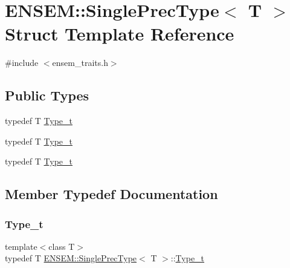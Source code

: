 \hypertarget{structENSEM_1_1SinglePrecType}{}\section{E\+N\+S\+EM\+:\+:Single\+Prec\+Type$<$ T $>$ Struct Template Reference}
\label{structENSEM_1_1SinglePrecType}


{\ttfamily \#include $<$ensem\+\_\+traits.\+h$>$}

\subsection*{Public Types}
\begin{DoxyCompactItemize}
\item 
typedef T \mbox{\hyperlink{structENSEM_1_1SinglePrecType_ab7ef789d62d59167eff4df3cc221c4e1}{Type\+\_\+t}}
\item 
typedef T \mbox{\hyperlink{structENSEM_1_1SinglePrecType_ab7ef789d62d59167eff4df3cc221c4e1}{Type\+\_\+t}}
\item 
typedef T \mbox{\hyperlink{structENSEM_1_1SinglePrecType_ab7ef789d62d59167eff4df3cc221c4e1}{Type\+\_\+t}}
\end{DoxyCompactItemize}


\subsection{Member Typedef Documentation}
\mbox{\label{structENSEM_1_1SinglePrecType_ab7ef789d62d59167eff4df3cc221c4e1}} 
\subsubsection{\texorpdfstring{Type\_t}{Type\_t}\hspace{0.1cm}{\footnotesize\ttfamily [1/3]}}
{\footnotesize\ttfamily template$<$class T$>$ \\
typedef T \mbox{\hyperlink{structENSEM_1_1SinglePrecType}{E\+N\+S\+E\+M\+::\+Single\+Prec\+Type}}$<$ T $>$\+::\mbox{\hyperlink{structENSEM_1_1SinglePrecType_ab7ef789d62d59167eff4df3cc221c4e1}{Type\+\_\+t}}}

\mbox{\label{structENSEM_1_1SinglePrecType_ab7ef789d62d59167eff4df3cc221c4e1}} 
